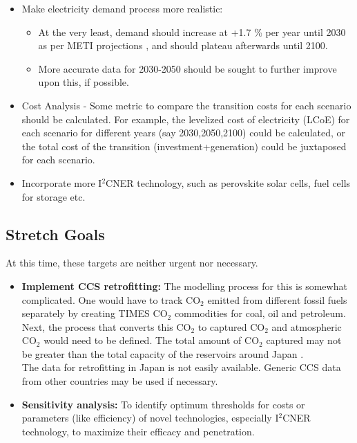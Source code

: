 \documentclass[14pt,a4paper]{article} %
\begin{document}
\begin{itemize}

\item Make electricity demand process more realistic:

\begin{itemize}
\item At the very least, demand should increase at +1.7 \% per year until 2030 as per METI projections \cite{noauthor_electricity_2017}, and should plateau afterwards until 2100.

\item More accurate data for 2030-2050 should be sought to further improve upon this, if possible.

\end{itemize}

\item Cost Analysis - Some metric to compare the transition costs for each scenario should be calculated. For example, the levelized cost of electricity (LCoE) for each scenario for different years (say 2030,2050,2100) could be calculated, or the total cost of the transition (investment+generation) could be juxtaposed for each scenario.

\item Incorporate more I$^2$CNER technology, such as perovskite solar cells, fuel cells for storage etc.


\end{itemize}

\subsection{Stretch Goals}
At this time, these targets are neither urgent nor necessary.

\begin{itemize}

\item \textbf{Implement CCS retrofitting:} The modelling process for this is somewhat complicated. One would have to track CO$_2$ emitted from different fossil fuels separately by creating TIMES CO$_2$ commodities for coal, oil and petroleum. Next, the process that converts this CO$_2$ to captured CO$_2$ and atmospheric CO$_2$ would need to be defined. The total amount of CO$_2$ captured may not be greater than the total capacity of the reservoirs around Japan \cite{kato_energy_2016}.\\
The data for retrofitting in Japan is not easily available. Generic CCS data from other countries may be used if necessary.\\

\item \textbf{Sensitivity analysis:} To identify optimum thresholds for costs or parameters (like efficiency) of novel technologies, especially I$^2$CNER technology, to maximize their efficacy and penetration.

\end{itemize}



%


%

\end{document}
